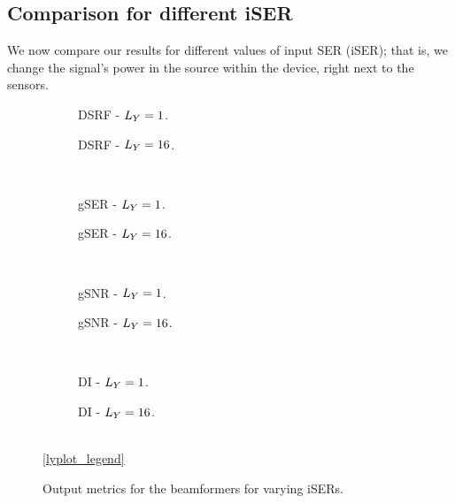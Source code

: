 
\subsection{Comparison for different iSER}

We now compare our results for different values of input SER (iSER); that is, we change the signal's power in the source within the device, right next to the sensors.
\begin{figure}[!ht]
	\centering
	\begin{subfigure}{0.49\textwidth}
		\centering
		
		\caption{DSRF - $\Ly = 1$.}
		\label{subfig:lineplot__DSRF__iSER_var__Ly_1}
	\end{subfigure}\hfill
	\begin{subfigure}{0.49\textwidth}
		\centering
		
		\caption{DSRF - $\Ly = 16$.}
		\label{subfig:lineplot__DSRF__iSER_var__Ly_16}
	\end{subfigure}\\[1em]
	\begin{subfigure}{0.49\textwidth}
		\centering
		
		\caption{gSER - $\Ly = 1$.}
		\label{subfig:lineplot__gSER__iSER_var__Ly_1}
	\end{subfigure}\hfill
	\begin{subfigure}{0.49\textwidth}
		\centering
		
		\caption{gSER - $\Ly = 16$.}
		\label{subfig:lineplot__gSER__iSER_var__Ly_16}
	\end{subfigure}\\[1em]
	\begin{subfigure}{0.49\textwidth}
		\centering
		
		\caption{gSNR - $\Ly = 1$.}
		\label{subfig:lineplot__gSNR__iSER_var__Ly_1}
	\end{subfigure}\hfill
	\begin{subfigure}{0.49\textwidth}
		\centering
		
		\caption{gSNR - $\Ly = 16$.}
		\label{subfig:lineplot__gSNR__iSER_var__Ly_16}
	\end{subfigure}\\[1em]
	\begin{subfigure}{0.49\textwidth}
		\centering
		
		\caption{DI - $\Ly = 1$.}
		\label{subfig:lineplot__DI__iSER_var__Ly_1}
	\end{subfigure}\hfill
	\begin{subfigure}{0.49\textwidth}
		\centering
		
		\caption{DI - $\Ly = 16$.}
		\label{subfig:lineplot__DI__iSER_var__Ly_16}
	\end{subfigure}\\[1em]
	\ref*{lyplot_legend}
	\caption{Output metrics for the beamformers for varying iSERs.}
	\label{fig:lineplot__iSER_var__Ly_1}
\end{figure}

